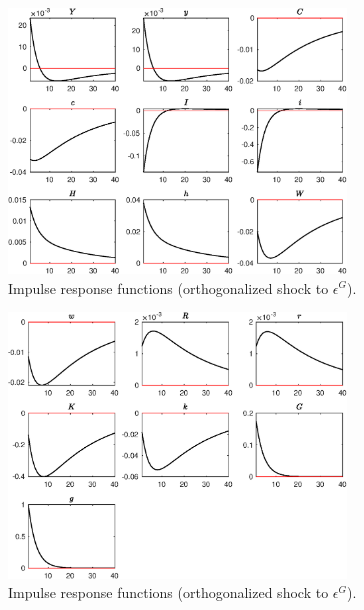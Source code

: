 \begin{figure}[H]
\centering 
\includegraphics[width=0.80\textwidth]{RBC_basic/graphs/RBC_basic_IRF_epsG1}
\caption{Impulse response functions (orthogonalized shock to ${\epsilon^{G}}$).}\label{Fig:IRF:epsG:1}
\end{figure}
 
\begin{figure}[H]
\centering 
\includegraphics[width=0.80\textwidth]{RBC_basic/graphs/RBC_basic_IRF_epsG2}
\caption{Impulse response functions (orthogonalized shock to ${\epsilon^{G}}$).}\label{Fig:IRF:epsG:2}
\end{figure}
 
 
